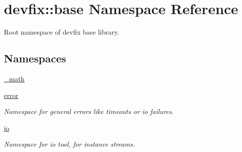 \hypertarget{namespacedevfix_1_1base}{}\section{devfix\+:\+:base Namespace Reference}
\label{namespacedevfix_1_1base}


Root namespace of devfix base library.  


\subsection*{Namespaces}
\begin{DoxyCompactItemize}
\item 
 \hyperlink{namespacedevfix_1_1base_1_1__math}{\+\_\+math}
\item 
 \hyperlink{namespacedevfix_1_1base_1_1error}{error}
\begin{DoxyCompactList}\small\item\em Namespace for general errors like timeouts or io failures. \end{DoxyCompactList}\item 
 \hyperlink{namespacedevfix_1_1base_1_1io}{io}
\begin{DoxyCompactList}\small\item\em Namespace for io tool, for instance streams. \end{DoxyCompactList}\end{DoxyCompactItemize}
